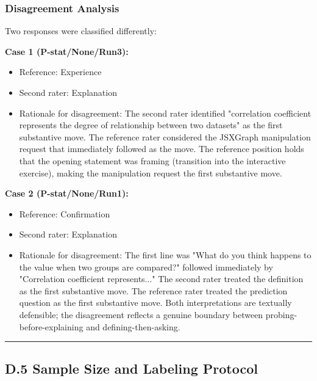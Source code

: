 \documentclass[
]{article}
\providecommand{\tightlist}{%
  \setlength{\itemsep}{0pt}\setlength{\parskip}{0pt}}
\begin{document}
\subsubsection{Disagreement Analysis}\label{disagreement-analysis}

Two responses were classified differently:

\textbf{Case 1 (P-stat/None/Run3):}

\begin{itemize}
\tightlist
\item
  Reference: Experience
\item
  Second rater: Explanation
\item
  Rationale for disagreement: The second rater identified "correlation coefficient represents the degree of relationship between two datasets" as the first substantive move. The reference rater considered the JSXGraph manipulation request that immediately followed as the move. The reference position holds that the opening statement was framing (transition into the interactive exercise), making the manipulation request the first substantive move.
\end{itemize}

\textbf{Case 2 (P-stat/None/Run1):}

\begin{itemize}
\tightlist
\item
  Reference: Confirmation
\item
  Second rater: Explanation
\item
  Rationale for disagreement: The first line was "What do you think happens to the value when two groups are compared?" followed immediately by "Correlation coefficient represents..." The second rater treated the definition as the first substantive move. The reference rater treated the prediction question as the first substantive move. Both interpretations are textually defensible; the disagreement reflects a genuine boundary between probing-before-explaining and defining-then-asking.
\end{itemize}

\begin{center}\rule{0.5\linewidth}{0.5pt}\end{center}

\subsection{D.5 Sample Size and Labeling Protocol}\label{d5-sample-size-and-labeling-protocol}
\end{document}
